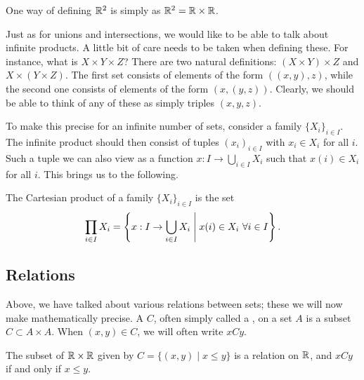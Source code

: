 \begin{example}
  One way of defining $\mathbb{R}^2$ is simply as $\mathbb{R}^2 = \mathbb{R} \times \mathbb{R}$.
\end{example}
Just as for unions and intersections, we would like to be able to talk about infinite products. A little bit of care needs to be taken when defining these. For instance, what is $X \times Y \times Z$? There are two natural definitions: $(X \times Y) \times Z$ and $X \times (Y \times Z)$. The first set consists of elements of the form $((x,y),z)$, while the second one consists of elements of the form $(x,(y,z))$. Clearly, we should be able to think of any of these as simply triples $(x,y,z)$.

To make this precise for an infinite number of sets, consider a family $\{X_i \}_{i \in I}$. The infinite product should then consist of tuples $(x_i)_{i \in I}$ with $x_i \in X_i$ for all $i$. Such a tuple we can also view as a function $x : I \to \bigcup_{i \in I} X_i$ such that $x(i) \in X_i$ for all $i$. This brings us to the following.
\begin{defn}
  The Cartesian product of a family $\{X_i \}_{i \in I}$ is the set
  \[
    \prod_{i \in I} X_i = \left\{ x : I \to \bigcup_{i \in I} X_i \mathrel{}\middle|\mathrel{} x(i) \in X_i \ \forall i \in I \right\}.
  \]
\end{defn}

\subsection{Relations}
Above, we have talked about various relations between sets; these we will now make mathematically precise. A  $C$, often simply called a , on a set $A$ is a subset $C \subset A \times A$. When $(x,y) \in C$, we will often write $xCy$.

\begin{example}
  \label{example-inequality}
  The subset of $\mathbb{R} \times \mathbb{R}$ given by $C = \{(x,y) \mid x \leq y\}$ is a relation on $\mathbb{R}$, and $xCy$ if and only if $x \leq y$.
\end{example}


